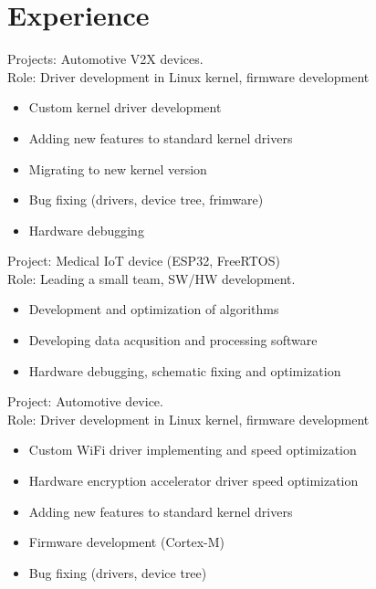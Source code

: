 \documentclass[11pt,a4paper]{moderncv}
\begin{document}
\section{Experience}
  {Projects: Automotive V2X devices.\\
    Role: Driver development in Linux kernel, firmware development
    \begin{itemize}
      \item Custom kernel driver development
      \item Adding new features to standard kernel drivers
      \item Migrating to new kernel version
      \item Bug fixing (drivers, device tree, frimware)
      \item Hardware debugging
    \end{itemize}}
  {Project: Medical IoT device (ESP32, FreeRTOS)\\
    Role: Leading a small team, SW/HW development.
    \begin{itemize}
      \item Development and optimization of algorithms
      \item Developing data acqusition and processing software
      \item Hardware debugging, schematic fixing and optimization
    \end{itemize}}
  {Project: Automotive device.\\
    Role: Driver development in Linux kernel, firmware development
    \begin{itemize}
      \item Custom WiFi driver implementing and speed optimization
      \item Hardware encryption accelerator driver speed optimization
      \item Adding new features to standard kernel drivers
      \item Firmware development (Cortex-M)
      \item Bug fixing (drivers, device tree)
    \end{itemize}}
\end{document}
